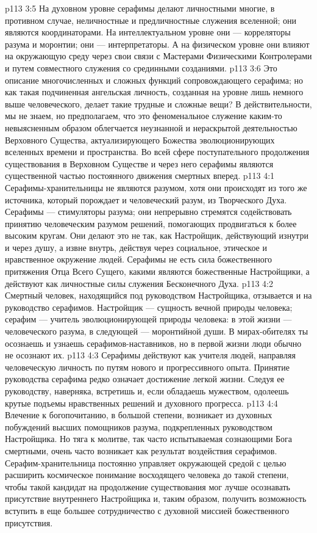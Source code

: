 \vs p113 3:5 На духовном уровне серафимы делают личностными многие, в противном случае, неличностные и предличностные служения вселенной; они являются координаторами. На интеллектуальном уровне они --- корреляторы разума и моронтии; они --- интерпретаторы. А на физическом уровне они влияют на окружающую среду через свои связи с Мастерами Физическими Контролерами и путем совместного служения со срединными созданиями.
\vs p113 3:6 Это описание многочисленных и сложных функций сопровождающего серафима; но как такая подчиненная ангельская личность, созданная на уровне лишь немного выше человеческого, делает такие трудные и сложные вещи? В действительности, мы не знаем, но предполагаем, что это феноменальное служение каким\hyp{}то невыясненным образом облегчается неузнанной и нераскрытой деятельностью Верховного Существа, актуализирующего Божества эволюционирующих вселенных времени и пространства. Во всей сфере поступательного продолжения существования в Верховном Существе и через него серафимы являются существенной частью постоянного движения смертных вперед.
\vs p113 4:1 Серафимы\hyp{}хранительницы не являются разумом, хотя они происходят из того же источника, который порождает и человеческий разум, из Творческого Духа. Серафимы --- стимуляторы разума; они непрерывно стремятся содействовать принятию человеческим разумом решений, помогающих продвигаться к более высоким кругам. Они делают это не так, как Настройщик, действующий изнутри и через душу, а извне внутрь, действуя через социальное, этическое и нравственное окружение людей. Серафимы не есть сила божественного притяжения Отца Всего Сущего, какими являются божественные Настройщики, а действуют как личностные силы служения Бесконечного Духа.
\vs p113 4:2 Смертный человек, находящийся под руководством Настройщика, отзывается и на руководство серафимов. Настройщик --- сущность вечной природы человека; серафим --- учитель эволюционирующей природы человека: в этой жизни --- человеческого разума, в следующей --- моронтийной души. В мирах\hyp{}обителях ты осознаешь и узнаешь серафимов\hyp{}наставников, но в первой жизни люди обычно не осознают их.
\vs p113 4:3 Серафимы действуют как учителя людей, направляя человеческую личность по путям нового и прогрессивного опыта. Принятие руководства серафима редко означает достижение легкой жизни. Следуя ее руководству, наверняка, встретишь и, если обладаешь мужеством, одолеешь крутые подъемы нравственных решений и духовного прогресса.
\vs p113 4:4 Влечение к богопочитанию, в большой степени, возникает из духовных побуждений высших помощников разума, подкрепленных руководством Настройщика. Но тяга к молитве, так часто испытываемая сознающими Бога смертными, очень часто возникает как результат воздействия серафимов. Серафим\hyp{}хранительница постоянно управляет окружающей средой с целью расширить космическое понимание восходящего человека до такой степени, чтобы такой кандидат на продолжение существования мог лучше осознавать присутствие внутреннего Настройщика и, таким образом, получить возможность вступить в еще большее сотрудничество с духовной миссией божественного присутствия.

